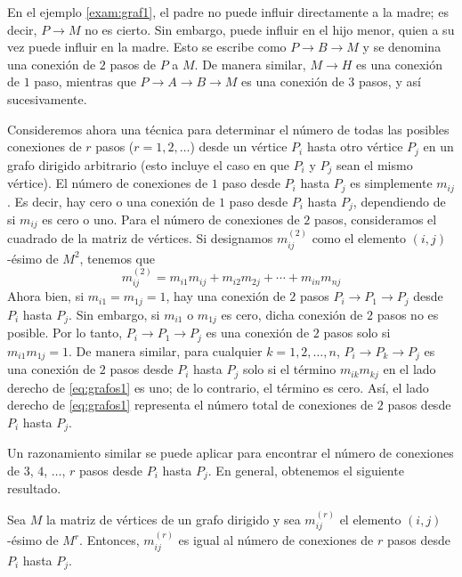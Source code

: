 En el ejemplo \ref{exam:graf1}, el padre no puede influir directamente a la madre; es decir, $P \to M$ no es cierto. Sin embargo, puede influir en el hijo menor, quien a su vez puede influir en la madre. Esto se escribe como $P \to B \to M$ y se denomina una conexión de $2$ pasos de $P$ a $M$. De manera similar, $M \to H$ es una conexión de $1$ paso, mientras que $P \to A \to B \to M$ es una conexión de $3$ pasos, y así sucesivamente.

Consideremos ahora una técnica para determinar el número de todas las posibles conexiones de $r$ pasos ($r = 1, 2, \dots$) desde un vértice $P_i$ hasta otro vértice $P_j$ en un grafo dirigido arbitrario (esto incluye el caso en que $P_i$ y $P_j$ sean el mismo vértice). El número de conexiones de $1$ paso desde $P_i$ hasta $P_j$ es simplemente $m_{ij}$. Es decir, hay cero o una conexión de $1$ paso desde $P_i$ hasta $P_j$, dependiendo de si $m_{ij}$ es cero o uno. Para el número de conexiones de $2$ pasos, consideramos el cuadrado de la matriz de vértices. Si designamos $m_{ij}^{(2)}$ como el elemento $(i, j)$-ésimo de $M^2$, tenemos que
\begin{equation}
    m_{ij}^{(2)} = m_{i1}m_{ij} + m_{i2}m_{2j} + \cdots + m_{in}m_{nj} \label{eq:grafos1}
\end{equation}
Ahora bien, si $m_{i1} = m_{1j} = 1$, hay una conexión de $2$ pasos $P_i \to P_1 \to P_j$ desde $P_i$ hasta $P_j$. Sin embargo, si $m_{i1}$ o $m_{1j}$ es cero, dicha conexión de $2$ pasos no es posible. Por lo tanto, $P_i \to P_1 \to P_j$ es una conexión de $2$ pasos solo si $m_{i1}m_{1j} = 1$. De manera similar, para cualquier $k = 1, 2, \dots, n$, $P_i \to P_k \to P_j$ es una conexión de $2$ pasos desde $P_i$ hasta $P_j$ solo si el término $m_{ik}m_{kj}$ en el lado derecho de \eqref{eq:grafos1} es uno; de lo contrario, el término es cero. Así, el lado derecho de \eqref{eq:grafos1} representa el número total de conexiones de $2$ pasos desde $P_i$ hasta $P_j$.

Un razonamiento similar se puede aplicar para encontrar el número de conexiones de $3$, $4$, $\dots$, $r$ pasos desde $P_i$ hasta $P_j$. En general, obtenemos el siguiente resultado.

\begin{theorem}\label{theo:rconexiones}
    Sea $M$ la matriz de vértices de un grafo dirigido y sea $m^{(r)}_{ij}$ el elemento $(i, j)$-ésimo de $M^r$. Entonces, $m^{(r)}_{ij}$ es igual al número de conexiones de $r$ pasos desde $P_i$ hasta $P_j$.
\end{theorem}

